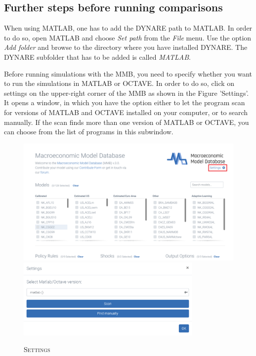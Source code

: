 \subsection*{Further steps before running comparisons}
When using MATLAB, one has to add the DYNARE path to MATLAB. In order to do so, open MATLAB and choose \textit{Set path} from the \textit{File} menu. Use the option \textit{Add folder} and browse to the directory where you have installed DYNARE. The DYNARE subfolder that has to be added is called \textit{MATLAB}.

Before running simulations with the MMB, you need to specify whether you want to run the simulations in MATLAB or OCTAVE. In order to do so, click on settings on the upper-right corner of the MMB as shown in the Figure 'Settings'. It opens a window, in which you have the option either to let the program scan for versions of MATLAB and OCTAVE installed on your computer, or to search manually. If the scan finds more than one version of MATLAB or OCTAVE, you can choose from the list of programs in this subwindow.

\begin{figure}[H]%
\centering
\caption{\textsc{Settings}}
\vspace{0.2cm}
\includegraphics[width=12cm,keepaspectratio]{settings.png}\\[1cm]
\includegraphics[width=9cm,keepaspectratio]{settings2.png}
\label{img:Settings}
\end{figure}







